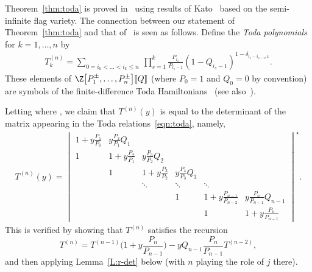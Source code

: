 \begin{Remark} \label{rmk:mns}
 Theorem~\ref{thm:toda} is proved in~\cite{maeno.naito.sagaki:QKideal} using results of Kato~\cite{kato:loop} based on the semi-infinite
 flag variety.
 		The connection between our statement of Theorem~\ref{thm:toda} and that of~\cite{maeno.naito.sagaki:QKideal} is seen as follows. Define the \textit{Toda polynomials}  for $k=1,\dots,n$ by
		\begin{align*}
		T^{(n)}_k = \sum_{0= i_0<\dots<i_k\leq n}\ \prod_{s=1}^{k}\frac{P_{i_s}}{P_{i_{s}-1}}\left(1-Q_{i_s-1}\right)^{1-\delta_{i_s-i_{s-1},1}}.
		\end{align*}
		These elements of $\Z\bigl[P_1^{\pm},\dots,P_{n}^{\pm}\bigr][\![Q]\!]$ (where $P_0=1$ and $Q_0=0$ by convention) are symbols of the finite-difference Toda Hamiltonians~\cite{etingof} (see also~\cite{act:2017,gloI,givental_lee,koroteev}).
		
		Letting  where , we claim that $T^{(n)}(y)$ is equal to the determinant of the matrix appearing in the Toda relations~\eqref{eqn:toda}, namely,
		\begin{align*}
 T^{(n)}(y)=\begin{vmatrix}
 1+y\frac{P_1}{P_0} & y\frac{P_2}{P_1}Q_1 & & & & \\[0.9mm]
 1 & 1+y\frac{P_2}{P_1} & y\frac{P_3}{P_2}Q_2 & & & \\[0.9mm]
 & 1 & 1+y\frac{P_3}{P_2} & y\frac{P_{4}}{P_{3}}Q_3 & & \\
 & & \ddots & \ddots & \ddots & \\
& & & 1 & 1+y\frac{P_{n-1}}{P_{n-2}} & y\frac{P_n}{P_{n-1}}Q_{n-1}\\[1mm]
& & & & 1 & 1+y\frac{P_n}{P_{n-1}}
\end{vmatrix}^\star.
		\end{align*}
		This is verified by showing that $T^{(n)}$ satisfies the recursion
		\begin{equation*}%
T^{(n)}= T^{(n-1)} \biggl(1+ y \frac{P_n}{P_{n-1}}\biggr) - y Q_{n-1} \frac{P_n}{P_{n-1}} T^{(n-2)} ,
		\end{equation*}
		and then applying Lemma~\ref{L:r-det} below (with $n$ playing the role of $j$ there).
		\end{Remark}

